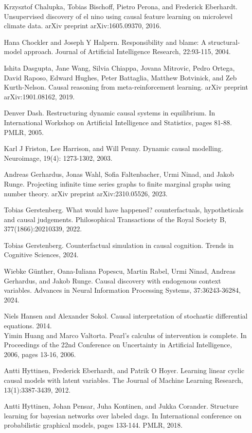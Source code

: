 \documentclass[10pt]{article}
\begin{document}
Krzysztof Chalupka, Tobias Bischoff, Pietro Perona, and Frederick Eberhardt. Unsupervised discovery of el nino using causal feature learning on microlevel climate data. arXiv preprint arXiv:1605.09370, 2016.

Hana Chockler and Joseph Y Halpern. Responsibility and blame: A structural-model approach. Journal of Artificial Intelligence Research, 22:93-115, 2004.

Ishita Dasgupta, Jane Wang, Silvia Chiappa, Jovana Mitrovic, Pedro Ortega, David Raposo, Edward Hughes, Peter Battaglia, Matthew Botvinick, and Zeb Kurth-Nelson. Causal reasoning from meta-reinforcement learning. arXiv preprint arXiv:1901.08162, 2019.

Denver Dash. Restructuring dynamic causal systems in equilibrium. In International Workshop on Artificial Intelligence and Statistics, pages 81-88. PMLR, 2005.

Karl J Friston, Lee Harrison, and Will Penny. Dynamic causal modelling. Neuroimage, 19(4): 1273-1302, 2003.

Andreas Gerhardus, Jonas Wahl, Sofia Faltenbacher, Urmi Ninad, and Jakob Runge. Projecting infinite time series graphs to finite marginal graphs using number theory. arXiv preprint arXiv:2310.05526, 2023.

Tobias Gerstenberg. What would have happened? counterfactuals, hypotheticals and causal judgements. Philosophical Transactions of the Royal Society B, 377(1866):20210339, 2022.

Tobias Gerstenberg. Counterfactual simulation in causal cognition. Trends in Cognitive Sciences, 2024.

Wiebke Günther, Oana-Iuliana Popescu, Martin Rabel, Urmi Ninad, Andreas Gerhardus, and Jakob Runge. Causal discovery with endogenous context variables. Advances in Neural Information Processing Systems, 37:36243-36284, 2024.

Niels Hansen and Alexander Sokol. Causal interpretation of stochastic differential equations. 2014.\\
Yimin Huang and Marco Valtorta. Pearl's calculus of intervention is complete. In Proceedings of the 22nd Conference on Uncertainty in Artificial Intelligence, 2006, pages 13-16, 2006.

Antti Hyttinen, Frederick Eberhardt, and Patrik O Hoyer. Learning linear cyclic causal models with latent variables. The Journal of Machine Learning Research, 13(1):3387-3439, 2012.

Antti Hyttinen, Johan Pensar, Juha Kontinen, and Jukka Corander. Structure learning for bayesian networks over labeled dags. In International conference on probabilistic graphical models, pages 133-144. PMLR, 2018.
\end{document}
